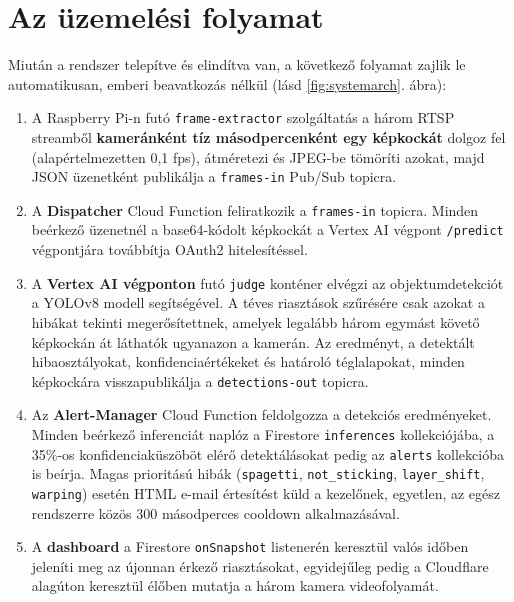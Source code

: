 \section{Az üzemelési folyamat}

Miután a rendszer telepítve és elindítva van, a következő folyamat zajlik le automatikusan,
emberi beavatkozás nélkül (lásd \ref{fig:systemarch}. ábra):

\begin{enumerate}
    \item A Raspberry Pi-n futó \texttt{frame-extractor} szolgáltatás a három RTSP streamből
          \textbf{kameránként tíz másodpercenként egy képkockát} dolgoz fel (alapértelmezetten 0,1 fps), átméretezi és JPEG-be tömöríti azokat,
          majd JSON üzenetként publikálja a \texttt{frames-in} Pub/Sub topicra.

    \item A \textbf{Dispatcher} Cloud Function feliratkozik a \texttt{frames-in} topicra.
          Minden beérkező üzenetnél a base64-kódolt képkockát a Vertex AI végpont \texttt{/predict} végpontjára
          továbbítja OAuth2 hitelesítéssel.

    \item A \textbf{Vertex AI végponton} futó \texttt{judge} konténer elvégzi az objektumdetekciót
          a YOLOv8 modell segítségével. A téves riasztások szűrésére csak azokat a hibákat tekinti megerősítettnek, amelyek
          legalább három egymást követő képkockán át láthatók ugyanazon a kamerán. Az eredményt, a detektált hibaosztályokat,
          konfidenciaértékeket és határoló téglalapokat, minden képkockára visszapublikálja a \texttt{detections-out} topicra.

    \item Az \textbf{Alert-Manager} Cloud Function feldolgozza a detekciós eredményeket. Minden beérkező inferenciát
          naplóz a Firestore \texttt{inferences} kollekciójába, a 35\%-os konfidenciaküszöböt elérő detektálásokat pedig
          az \texttt{alerts} kollekcióba is beírja. Magas prioritású hibák (\texttt{spagetti}, \texttt{not\_sticking}, \texttt{layer\_shift}, \texttt{warping})
          esetén HTML e-mail értesítést küld a kezelőnek, egyetlen, az egész rendszerre közös 300 másodperces cooldown alkalmazásával.

    \item A \textbf{dashboard} a Firestore \texttt{onSnapshot} listenerén keresztül valós időben jeleníti meg
          az újonnan érkező riasztásokat, egyidejűleg pedig a Cloudflare alagúton keresztül élőben mutatja
          a három kamera videofolyamát.
\end{enumerate}


